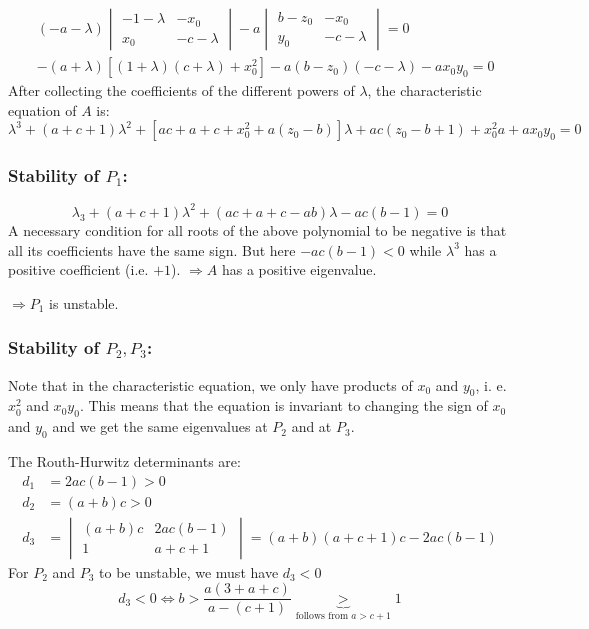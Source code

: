 \documentclass[twoside,10pt,a4paper]{article}
\begin{document}
\begin{enumerate}[label=(\alph*)]
\begin{align*}
&(-a-\lambda)\begin{vmatrix}-1-\lambda & -x_0 \\ x_0 & -c-\lambda \end{vmatrix} - a \begin{vmatrix} b-z_0 & -x_0 \\ y_0 & -c-\lambda \end{vmatrix} =0 \\
&-(a+\lambda)\left[ (1+\lambda) (c+\lambda) + x_0^2 \right] -a(b-z_0)(-c-\lambda) -ax_0y_0= 0
\end{align*}
After collecting the coefficients of the different powers of $\lambda$, the characteristic equation of $A$ is:
\begin{equation*}
	\lambda^3 + (a+c+1)\lambda^2 + [ac + a + c + x_0^2 + a(z_0 - b)]\lambda + ac(z_0 - b + 1) + x_0^2a + ax_0y_0 = 0
\end{equation*}


\subsubsection*{Stability of $P_1$:}
\begin{equation*}
	\lambda_3 + (a + c + 1)\lambda^2 + (ac + a + c -ab)\lambda - ac(b-1) = 0
\end{equation*}
A necessary condition for all roots of the above polynomial to be negative is that all its coefficients have the same sign. But here $-ac(b-1)<0$ while $\lambda^3$ has a positive coefficient (i.e. $+1$). $\Longrightarrow A$ has a positive eigenvalue.

$\Longrightarrow P_1$ is unstable.

\subsubsection*{Stability of $P_2, P_3$:}
Note that in the characteristic equation, we only have products of $x_0$ and $y_0$, i. e. $x_0^2$ and $x_0y_0$. This means that the equation is invariant to changing the sign of $x_0$ and $y_0$ and we get the same eigenvalues at $P_2$ and at $P_3$. 

The Routh-Hurwitz determinants are:
\begin{align*}
	d_1 &= 2ac(b - 1) > 0 \\
	d_2 &= (a + b)c > 0 \\
	d_3 &= \begin{vmatrix}
		(a + b)c & 2ac(b - 1) \\
		1 & a + c + 1
	\end{vmatrix} = (a + b)(a + c + 1)c - 2ac(b - 1)
\end{align*}
For $P_2$ and $P_3$ to be unstable, we must have $d_3 < 0$
\begin{equation*}
	d_3 < 0 \Longleftrightarrow b > \frac{a(3 + a + c)}{a - (c + 1)} \underbrace{>}_{\text{follows from }a>c+1} 1
\end{equation*}


\end{enumerate}
\end{document}
